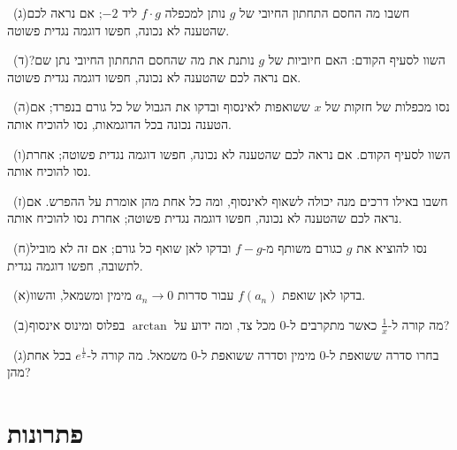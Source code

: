 \documentclass[12pt, a4paper]{article}
\begin{document}
\noindent {}\ (ג)\enskip חשבו מה החסם התחתון החיובי של $g$ נותן למכפלה $f\cdot g$ ליד $-2$; אם נראה לכם שהטענה לא נכונה, חפשו דוגמה נגדית פשוטה.\par\smallskip
\noindent {}\ (ד)\enskip השוו לסעיף הקודם: האם חיוביות של $g$ נותנת את מה שהחסם התחתון החיובי נתן שם? אם נראה לכם שהטענה לא נכונה, חפשו דוגמה נגדית פשוטה.\par\smallskip
\noindent {}\ (ה)\enskip נסו מכפלות של חזקות של $x$ ששואפות לאינסוף ובדקו את הגבול של כל גורם בנפרד; אם הטענה נכונה בכל הדוגמאות, נסו להוכיח אותה.\par\smallskip
\noindent {}\ (ו)\enskip השוו לסעיף הקודם. אם נראה לכם שהטענה לא נכונה, חפשו דוגמה נגדית פשוטה; אחרת נסו להוכיח אותה.\par\smallskip
\noindent {}\ (ז)\enskip חשבו באילו דרכים מנה יכולה לשאוף לאינסוף, ומה כל אחת מהן אומרת על ההפרש. אם נראה לכם שהטענה לא נכונה, חפשו דוגמה נגדית פשוטה; אחרת נסו להוכיח אותה.\par\smallskip
\noindent {}\ (ח)\enskip נסו להוציא את $g$ כגורם משותף מ-$f-g$ ובדקו לאן שואף כל גורם; אם זה לא מוביל לתשובה, חפשו דוגמה נגדית.\par\smallskip
\noindent {}\ (א)\enskip בדקו לאן שואפת $f(a_n)$ עבור סדרות $a_n\to0$ מימין ומשמאל, והשוו.\par\smallskip
\noindent {}\ (ב)\enskip מה קורה ל-$\frac1x$ כאשר מתקרבים ל-$0$ מכל צד, ומה ידוע על $\arctan$ בפלוס ומינוס אינסוף?\par\smallskip
\noindent {}\ (ג)\enskip בחרו סדרה ששואפת ל-$0$ מימין וסדרה ששואפת ל-$0$ משמאל. מה קורה ל-$e^{\frac1x}$ בכל אחת מהן?\par\smallskip

\newpage
\section*{פתרונות}
\renewcommand{\hint}[1]{}   %
\setcounter{section}{0}


\end{document}
